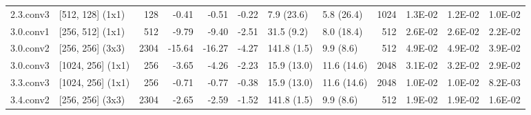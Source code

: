 \begin{table}
\begin{tabular}{llrrrrllrrrr}
2.3.conv3 & [512, 128] (1x1) & 128 & {\cellcolor[HTML]{ECF7A6}} \color[HTML]{000000} -0.41 & {\cellcolor[HTML]{EEF8A8}} \color[HTML]{000000} -0.51 & {\cellcolor[HTML]{EBF7A3}} \color[HTML]{000000} -0.22 & 7.9 (23.6) & 5.8 (26.4) & 1024 & {\cellcolor[HTML]{CFEB85}} \color[HTML]{000000} 1.3E-02 & {\cellcolor[HTML]{CDEA83}} \color[HTML]{000000} 1.2E-02 & {\cellcolor[HTML]{C1E57B}} \color[HTML]{000000} 1.0E-02 \\
3.0.conv1 & [256, 512] (1x1) & 512 & {\cellcolor[HTML]{FCAA5F}} \color[HTML]{000000} -9.79 & {\cellcolor[HTML]{FDB163}} \color[HTML]{000000} -9.40 & {\cellcolor[HTML]{FFFCBA}} \color[HTML]{000000} -2.51 & 31.5 (9.2) & 8.0 (18.4) & 512 & {\cellcolor[HTML]{FFF5AE}} \color[HTML]{000000} 2.6E-02 & {\cellcolor[HTML]{FFF7B2}} \color[HTML]{000000} 2.6E-02 & {\cellcolor[HTML]{F7FCB4}} \color[HTML]{000000} 2.2E-02 \\
3.0.conv2 & [256, 256] (3x3) & 2304 & {\cellcolor[HTML]{E24731}} \color[HTML]{F1F1F1} -15.64 & {\cellcolor[HTML]{DD3D2D}} \color[HTML]{F1F1F1} -16.27 & {\cellcolor[HTML]{FEEDA1}} \color[HTML]{000000} -4.27 & 141.8 (1.5) & 9.9 (8.6) & 512 & {\cellcolor[HTML]{F67A49}} \color[HTML]{F1F1F1} 4.9E-02 & {\cellcolor[HTML]{F67A49}} \color[HTML]{F1F1F1} 4.9E-02 & {\cellcolor[HTML]{FDBF6F}} \color[HTML]{000000} 3.9E-02 \\
3.0.conv3 & [1024, 256] (1x1) & 256 & {\cellcolor[HTML]{FFF2AA}} \color[HTML]{000000} -3.65 & {\cellcolor[HTML]{FEEDA1}} \color[HTML]{000000} -4.26 & {\cellcolor[HTML]{FFFEBE}} \color[HTML]{000000} -2.23 & 15.9 (13.0) & 11.6 (14.6) & 2048 & {\cellcolor[HTML]{FEE491}} \color[HTML]{000000} 3.1E-02 & {\cellcolor[HTML]{FEE08B}} \color[HTML]{000000} 3.2E-02 & {\cellcolor[HTML]{FEEC9F}} \color[HTML]{000000} 2.9E-02 \\
3.3.conv3 & [1024, 256] (1x1) & 256 & {\cellcolor[HTML]{F1F9AC}} \color[HTML]{000000} -0.71 & {\cellcolor[HTML]{F1F9AC}} \color[HTML]{000000} -0.77 & {\cellcolor[HTML]{ECF7A6}} \color[HTML]{000000} -0.38 & 15.9 (13.0) & 11.6 (14.6) & 2048 & {\cellcolor[HTML]{C1E57B}} \color[HTML]{000000} 1.0E-02 & {\cellcolor[HTML]{C3E67D}} \color[HTML]{000000} 1.0E-02 & {\cellcolor[HTML]{B7E075}} \color[HTML]{000000} 8.2E-03 \\
3.4.conv2 & [256, 256] (3x3) & 2304 & {\cellcolor[HTML]{FFFBB8}} \color[HTML]{000000} -2.65 & {\cellcolor[HTML]{FFFCBA}} \color[HTML]{000000} -2.59 & {\cellcolor[HTML]{F8FCB6}} \color[HTML]{000000} -1.52 & 141.8 (1.5) & 9.9 (8.6) & 512 & {\cellcolor[HTML]{EEF8A8}} \color[HTML]{000000} 1.9E-02 & {\cellcolor[HTML]{EEF8A8}} \color[HTML]{000000} 1.9E-02 & {\cellcolor[HTML]{E2F397}} \color[HTML]{000000} 1.6E-02 \\

\end{tabular}
\end{table}
